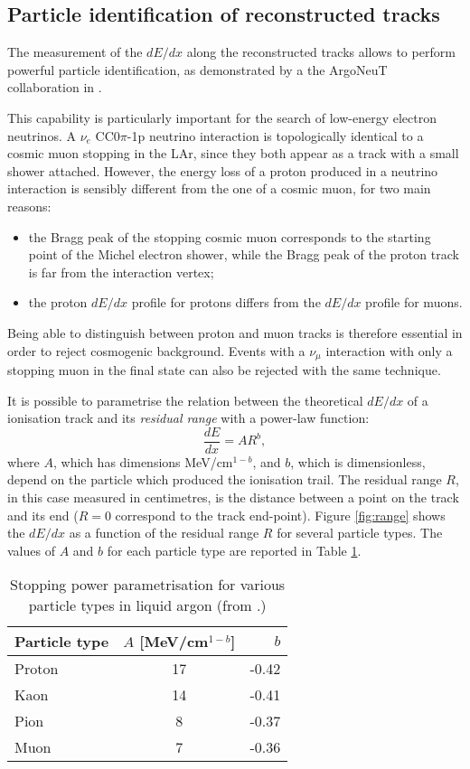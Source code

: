 \subsection{Particle identification of reconstructed tracks}\label{sec:proton_id}
The measurement of the $dE/dx$ along the reconstructed tracks allows to perform powerful particle identification, as demonstrated by a the ArgoNeuT collaboration in \cite{Acciarri:2013met}. 

This capability is particularly important for the search of low-energy electron neutrinos. A $\nu_e$ CC0$\pi$-1p neutrino interaction is topologically identical to a cosmic muon stopping in the LAr, since they both appear as a track with a small shower attached. However, the energy loss of a proton produced in a neutrino interaction is sensibly different from the one of a cosmic muon, for two main reasons:
\begin{itemize}
    \item the Bragg peak of the stopping cosmic muon corresponds to the starting point of the Michel electron shower, while the Bragg peak of the proton track is far from the interaction vertex;
    \item the proton $dE/dx$ profile for protons differs from the $dE/dx$ profile for muons.
\end{itemize}
Being able to distinguish between proton and muon tracks is therefore essential in order to reject cosmogenic background. Events with a $\nu_{\mu}$ interaction with only a stopping muon in the final state can also be rejected with the same technique.

It is possible to parametrise the relation between the theoretical $dE/dx$ of a ionisation track and its \emph{residual range} with a power-law function:
\begin{equation}
    \frac{dE}{dx} = A R^b,
\end{equation}
where $A$, which has dimensions MeV/cm$^{1-b}$, and $b$, which is dimensionless, depend on the particle which produced the ionisation trail. The residual range $R$, in this case measured in centimetres, is the distance between a point on the track and its end ($R=0$ correspond to the track end-point).
Figure \ref{fig:range} shows the $dE/dx$ as a function of the residual range $R$ for several particle types. The values of $A$ and $b$ for each particle type are reported in Table \ref{tab:range}.

\begin{table}[htbp]
   \centering
   \caption{Stopping power parametrisation for various particle types in liquid argon (from \cite{Acciarri:2013met}.)}\label{tab:range}
   \begin{tabular}{lcr}
     \toprule
     Particle type & $A$ [MeV/cm$^{1-b}$] & $b$ \\
     \midrule
     Proton & 17 & -0.42 \\
     Kaon & 14 & -0.41 \\
     Pion & 8 & -0.37 \\
     Muon & 7 & -0.36 \\
     \bottomrule
   \end{tabular}
\end{table}

